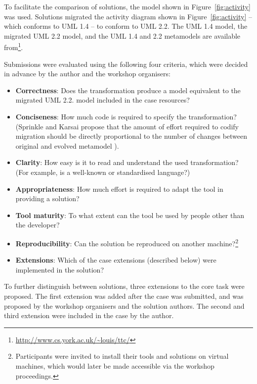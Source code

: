 To facilitate the comparison of solutions, the model shown in Figure~\ref{fig:activity} was used. Solutions migrated the activity diagram shown in Figure~\ref{fig:activity} -- which conforms to UML 1.4 -- to conform to UML 2.2. The UML 1.4 model, the migrated UML 2.2 model, and the UML 1.4 and 2.2 metamodels are available from\footnote{\url{http://www.cs.york.ac.uk/~louis/ttc/}}.

Submissions were evaluated using the following four criteria, which were decided in advance by the author and the workshop organisers:

\begin{itemize}
	\item \textbf{Correctness}: Does the transformation produce a model equivalent to the migrated UML 2.2. model included in the case resources?
	\item \textbf{Conciseness}: How much code is required to specify the transformation? (Sprinkle \cc and Karsai propose that the amount of effort required to codify migration should be directly proportional to the number of changes between original and evolved metamodel \cite{sprinkle04domain}).
		\item \textbf{Clarity}: How easy is it to read and understand the used transformation? (For example, is a well-known or standardised language?)
		\item \textbf{Appropriateness}: How much effort is required to adapt the tool in providing a solution?
		\item \textbf{Tool maturity}: To what extent can the tool be used by people other than the developer? 
		\item \textbf{Reproducibility}: Can the solution be reproduced on another machine?\footnote{Participants were invited to install their tools and solutions on virtual machines, which would later be made accessible via the workshop proceedings.}
		\item \textbf{Extensions}: Which of the case extensions (described below) were implemented in the solution?
\end{itemize}

To further distinguish between solutions, three extensions to the core task were proposed. The first extension was added after the case was submitted, and was proposed by the workshop organisers and the solution authors. The second and third extension were included in the case by the author. 

